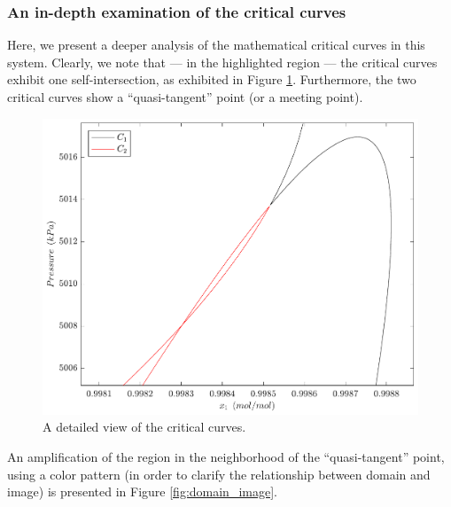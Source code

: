 \documentclass[journal=iecred,manuscript=article]{achemso}
\theoremstyle{definition}
\theoremstyle{remark}
\begin{document}
\subsubsection{An in-depth examination of the critical curves}

Here, we present a deeper analysis of the mathematical critical curves in this system. Clearly, we note that --- in the highlighted region --- the critical curves exhibit one self-intersection, as exhibited in Figure \ref{fig:sinais}. Furthermore, the two critical curves show a \enquote{quasi-tangent} point (or a meeting point).

\begin{figure}
	\begin{center}
		\includegraphics[scale=0.50]{curvas_criticas_dominio_new.pdf}
		\caption{A detailed view of the critical curves.}\label{fig:sinais}
	\end{center}
\end{figure}
 
\noindent An amplification of the region in the neighborhood of the \enquote{quasi-tangent} point, using a color pattern (in order to clarify the relationship between domain and image) is presented in Figure \ref{fig:domain_image}.
\end{document}
